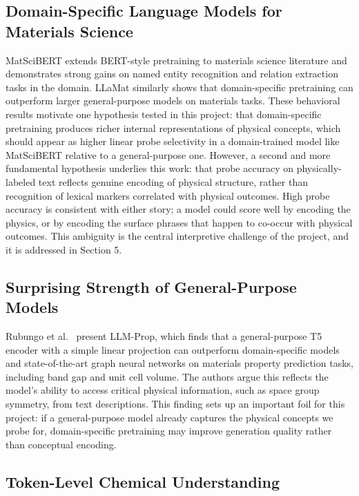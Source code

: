 \documentclass[11pt]{article}
\begin{document}
\subsection{Domain-Specific Language Models for Materials Science}

MatSciBERT \cite{gupta2022} extends BERT-style pretraining to materials science literature and demonstrates strong gains on named entity recognition and relation extraction tasks in the domain. LLaMat similarly shows that domain-specific pretraining can outperform larger general-purpose models on materials tasks. These behavioral results motivate one hypothesis tested in this project: that domain-specific pretraining produces richer internal representations of physical concepts, which should appear as higher linear probe selectivity in a domain-trained model like MatSciBERT relative to a general-purpose one.
However, a second and more fundamental hypothesis underlies this work: that probe accuracy on physically-labeled text reflects genuine encoding of physical structure, rather than recognition of lexical markers correlated with physical outcomes. High probe accuracy is consistent with either story; a model could score well by encoding the physics, or by encoding the surface phrases that happen to co-occur with physical outcomes. This ambiguity is the central interpretive challenge of the project, and it is addressed in Section 5.

\subsection{Surprising Strength of General-Purpose Models}

Rubungo et al.\ \cite{rubungo2023} present LLM-Prop, which finds that a general-purpose T5 encoder with a simple linear projection can outperform domain-specific models and state-of-the-art graph neural networks on materials property prediction tasks, including band gap and unit cell volume. The authors argue this reflects the model's ability to access critical physical information, such as space group symmetry, from text descriptions. This finding sets up an important foil for this project: if a general-purpose model already captures the physical concepts we probe for, domain-specific pretraining may improve generation quality rather than conceptual encoding.

\subsection{Token-Level Chemical Understanding}
\end{document}
